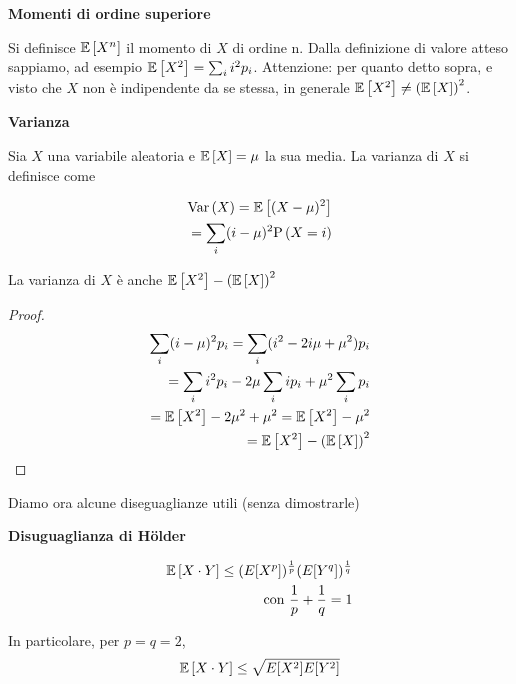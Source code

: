 \begin{defn}
	\textbf{Momenti di ordine superiore}

	Si definisce $\mathbb{E}\left[X^n\right]$ il momento di $X$ di ordine n.
	Dalla definizione di valore atteso sappiamo, ad esempio $ \mathbb{E}\left[X^2\right] = \sum_i i^2 p_i$.
Attenzione: per quanto detto sopra, e visto che $X$ non \`e indipendente da se stessa, in generale
$ \mathbb{E}\left[X^2\right] \neq \left(\mathbb{E}\left[X\right]\right)^2$.
\end{defn}


\begin{defn}
    \textbf{Varianza}
    
    Sia $ X $ una variabile aleatoria e $ \mathbb{E}\left[X\right] = \mu $ la sua media.
    La varianza di $ X $ si definisce come 
    
    \begin{equation*}
    \begin{aligned}
    \text{Var}\left(X\right) = \mathbb{E}\left[(X-\mu)^2\right] \\ 
    = \sum_i (i-\mu)^2 \text{P}\left(X = i\right)
    \end{aligned}
    \end{equation*}
\end{defn}
\begin{prop}
    La varianza di $ X $ \`e anche $ \mathbb{E}\left[X^2\right] - \left(\mathbb{E}\left[X\right]\right)^2 $
\end{prop}
    \begin{proof}
        \begin{equation*}
        \begin{aligned}
        \sum_i (i-\mu)^2 p_i = \sum_i (i^2 -2i\mu + \mu^2) p_i \\
        = \sum_i i^2 p_i - 2\mu \sum_i i p_i + \mu^2 \sum_i p_i \\
        = \mathbb{E}\left[X^2\right] - 2\mu^2 + \mu^2 = \mathbb{E}\left[X^2\right] - \mu^2 \\
        = \mathbb{E}\left[X^2\right] - \left(\mathbb{E}\left[X\right]\right)^2 
        \end{aligned}
        \end{equation*}
    \end{proof}

Diamo ora alcune diseguaglianze utili (senza dimostrarle)



\begin{prop}
	\textbf{Disuguaglianza di H\"older}

    \begin{equation}
        \begin{aligned}
        \mathbb{E}\left[X \cdot Y\right] \leq (E[X^p])^{\frac{1}{p}} (E[Y^q])^{\frac{1}{q}} \\
        \text{con } \dfrac{1}{p} + \dfrac{1}{q} = 1
        \end{aligned}
    \end{equation}

    In particolare, per $p=q=2$,
    \begin{equation}
		\mathbb{E}\left[X \cdot Y\right] \leq \sqrt{E[X^2]E[Y^2]}
    \end{equation}

\end{prop}

